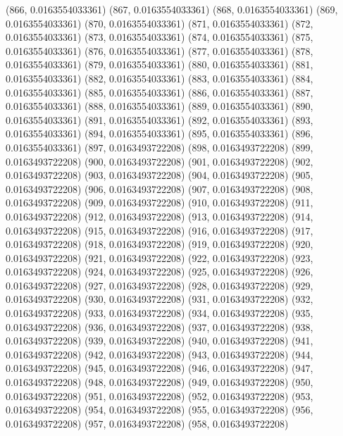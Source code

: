 {					(866, 0.0163554033361)
					(867, 0.0163554033361)
					(868, 0.0163554033361)
					(869, 0.0163554033361)
					(870, 0.0163554033361)
					(871, 0.0163554033361)
					(872, 0.0163554033361)
					(873, 0.0163554033361)
					(874, 0.0163554033361)
					(875, 0.0163554033361)
					(876, 0.0163554033361)
					(877, 0.0163554033361)
					(878, 0.0163554033361)
					(879, 0.0163554033361)
					(880, 0.0163554033361)
					(881, 0.0163554033361)
					(882, 0.0163554033361)
					(883, 0.0163554033361)
					(884, 0.0163554033361)
					(885, 0.0163554033361)
					(886, 0.0163554033361)
					(887, 0.0163554033361)
					(888, 0.0163554033361)
					(889, 0.0163554033361)
					(890, 0.0163554033361)
					(891, 0.0163554033361)
					(892, 0.0163554033361)
					(893, 0.0163554033361)
					(894, 0.0163554033361)
					(895, 0.0163554033361)
					(896, 0.0163554033361)
					(897, 0.0163493722208)
					(898, 0.0163493722208)
					(899, 0.0163493722208)
					(900, 0.0163493722208)
					(901, 0.0163493722208)
					(902, 0.0163493722208)
					(903, 0.0163493722208)
					(904, 0.0163493722208)
					(905, 0.0163493722208)
					(906, 0.0163493722208)
					(907, 0.0163493722208)
					(908, 0.0163493722208)
					(909, 0.0163493722208)
					(910, 0.0163493722208)
					(911, 0.0163493722208)
					(912, 0.0163493722208)
					(913, 0.0163493722208)
					(914, 0.0163493722208)
					(915, 0.0163493722208)
					(916, 0.0163493722208)
					(917, 0.0163493722208)
					(918, 0.0163493722208)
					(919, 0.0163493722208)
					(920, 0.0163493722208)
					(921, 0.0163493722208)
					(922, 0.0163493722208)
					(923, 0.0163493722208)
					(924, 0.0163493722208)
					(925, 0.0163493722208)
					(926, 0.0163493722208)
					(927, 0.0163493722208)
					(928, 0.0163493722208)
					(929, 0.0163493722208)
					(930, 0.0163493722208)
					(931, 0.0163493722208)
					(932, 0.0163493722208)
					(933, 0.0163493722208)
					(934, 0.0163493722208)
					(935, 0.0163493722208)
					(936, 0.0163493722208)
					(937, 0.0163493722208)
					(938, 0.0163493722208)
					(939, 0.0163493722208)
					(940, 0.0163493722208)
					(941, 0.0163493722208)
					(942, 0.0163493722208)
					(943, 0.0163493722208)
					(944, 0.0163493722208)
					(945, 0.0163493722208)
					(946, 0.0163493722208)
					(947, 0.0163493722208)
					(948, 0.0163493722208)
					(949, 0.0163493722208)
					(950, 0.0163493722208)
					(951, 0.0163493722208)
					(952, 0.0163493722208)
					(953, 0.0163493722208)
					(954, 0.0163493722208)
					(955, 0.0163493722208)
					(956, 0.0163493722208)
					(957, 0.0163493722208)
					(958, 0.0163493722208)
}
